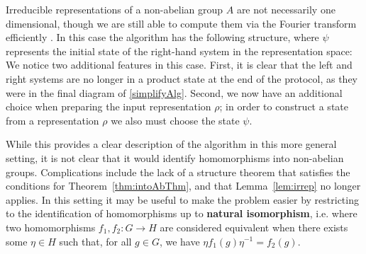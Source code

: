 Irreducible representations of a non-abelian group $A$ are not necessarily one dimensional, though we are still able to compute them via the Fourier transform efficiently \cite{childs2010quantum}. In this case the algorithm has the following structure, where $\psi$ represents the initial state of the right-hand system in the representation space:
\begin{equation}
\label{eq:NonAbAlg}

\end{equation}
We notice two additional features in this case. First, it is clear that the left and right systems are no longer in a product state at the end of the protocol, as they were in the final diagram of \eqref{simplifyAlg}. Second, we now have an additional choice when preparing the input representation $\rho$; in order to construct a state from a representation $\rho$ we also must choose the state $\psi$.

While this provides a clear description of the algorithm in this more general setting, it is not clear that it would identify homomorphisms into non-abelian groups. Complications include the lack of a structure theorem that satisfies the conditions for Theorem~\ref{thm:intoAbThm}, and that Lemma~\ref{lem:irrep} no longer applies.  In this setting it may be useful to make the problem easier by restricting to the identification of homomorphisms up to \textbf{natural isomorphism}, i.e. where two homomorphisms $f_1,f_2:G\to H$ are considered equivalent when there exists some $\eta\in H$ such that, for all $g\in G$, we have $\eta f_1(g) \eta^{-1} = f_2(g)$.


\newpage
